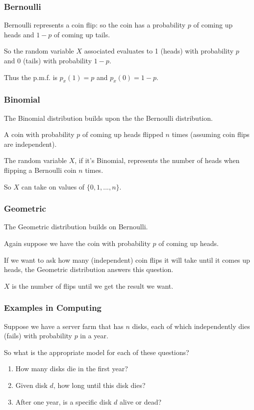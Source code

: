 \begin{frame}
\frametitle{Bernoulli}

Bernoulli represents a coin flip: so the coin has a probability $p$ of coming up heads and $1-p$ of coming up tails. 

So the random variable $X$ associated evaluates to 1 (heads) with probability $p$ and 0 (tails) with probability $1-p$. 

Thus the p.m.f. is $p_{x}(1) = p$ and $p_{x}(0) = 1 - p$. 

\end{frame}



\begin{frame}
\frametitle{Binomial}

The Binomial distribution builds upon the the Bernoulli distribution. 

A coin with probability $p$ of coming up heads flipped $n$ times (assuming coin flips are independent). 

The random variable $X$, if it's Binomial, represents the number of heads when flipping a Bernoulli coin $n$ times. 

So $X$ can take on values of $\{0, 1, ..., n\}$. 

\end{frame}



\begin{frame}
\frametitle{Geometric}

The Geometric distribution builds on Bernoulli. 

Again suppose we have the coin with probability $p$ of coming up heads. 

If we want to ask how many (independent) coin flips it will take until it comes up heads, the Geometric distribution answers this question. 

$X$ is the number of flips until we get the result we want.


\end{frame}



\begin{frame}
\frametitle{Examples in Computing}

Suppose we have a server farm that has $n$ disks, each of which independently dies (fails) with probability $p$ in a year. 

So what is the appropriate model for each of these questions?

\begin{enumerate}
	\item How many disks die in the first year?
	\item Given disk $d$, how long until this disk dies?
	\item After one year, is a specific disk $d$ alive or dead?
\end{enumerate}

\end{frame}



